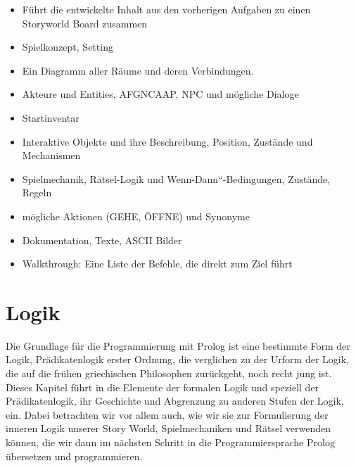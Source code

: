 \documentclass[parskip=half,a4paper,11pt]{scrreprt}
\begin{document}
\begin{itemize}
    \item Führt die entwickelte Inhalt aus den vorherigen Aufgaben zu einen Storyworld Board zusammen
    \item Spielkonzept, Setting
    \item Ein Diagramm aller Räume und deren Verbindungen.
    \item Akteure und Entities, AFGNCAAP, NPC und mögliche Dialoge
    \item Startinventar     
    \item Interaktive Objekte und ihre Beschreibung, Position, Zustände und Mechanismen
    \item Spielmechanik, Rätsel-Logik und Wenn-Dann“-Bedingungen, Zustände, Regeln
    \item mögliche Aktionen (GEHE, ÖFFNE) und Synonyme
    \item Dokumentation, Texte, ASCII Bilder
    \item Walkthrough: Eine Liste der Befehle, die direkt zum Ziel führt
\end{itemize}

\chapter{Logik}

Die Grundlage für die Programmierung mit Prolog ist eine bestimmte Form der Logik, Prädikatenlogik erster Ordnung, die verglichen zu der Urform der Logik, die auf die frühen griechischen Philosophen zurückgeht, noch recht jung ist. Dieses Kapitel führt in die Elemente der formalen Logik und speziell der Prädikatenlogik, ihr Geschichte und Abgrenzung zu anderen Stufen der Logik, ein. Dabei betrachten wir vor allem auch, wie wir sie zur Formulierung der inneren Logik unserer Story World, Spielmechaniken und Rätsel verwenden können, die wir dann im nächsten Schritt in die Programmiersprache Prolog übersetzen und programmieren. 
\end{document}
